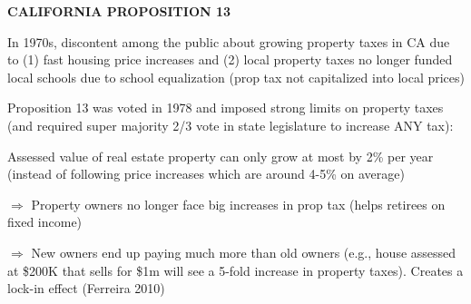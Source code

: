\documentclass[landscape]{slides}
\begin{document}
\begin{slide}
\begin{center}
{\bf CALIFORNIA PROPOSITION 13}
\end{center}

In 1970s, discontent among the public about growing property taxes in CA due to (1) fast housing price increases and (2) local property taxes no longer funded local schools due to school equalization
(prop tax not capitalized into local prices)

Proposition 13 was voted in 1978 and imposed strong limits on property taxes (and required super majority 2/3 vote in state legislature to increase ANY tax):

Assessed value of real estate property can only grow at most by 2\% per year (instead of following price increases which are around 4-5\% on average)

\small

$\Rightarrow$ Property owners no longer face big increases in prop tax (helps retirees on fixed income)

$\Rightarrow$ New owners end up paying much more than old owners (e.g., house assessed at \$200K that sells for \$1m will see a 5-fold increase in property taxes). Creates a lock-in effect (Ferreira 2010)

\end{slide}


%

%
%

%
%
%
%
%
\end{document}

